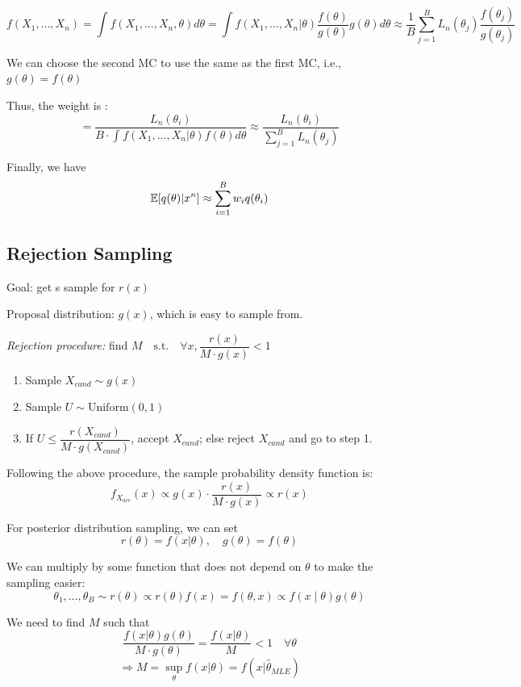 \[
f(X_1,\dots,X_n) = \int f(X_1,\dots,X_n,\theta) d \theta = \int f(X_1,\dots,X_n | \theta) \dfrac{f(\theta)}{g(\theta)} g(\theta) d \theta \approx \dfrac{1}{B} \sum_{j=1}^{B} L_n(\theta_j) \dfrac{f(\theta_j)}{g(\theta_j)}
\]

We can choose the second MC to use the same as the first MC, i.e., $g(\theta) = f(\theta)$

Thus, the weight is :
\[
=  \dfrac{L_n(\theta_i)}{B \cdot \int_{}^{} f(X_1,\dots,X_n | \theta) f(\theta) d\theta} \approx \frac{L_n(\theta_i)}{ \sum\limits_{j=1}^{B} L_n(\theta_j) } 
\]

Finally, we have
\[
\mathbb{E}[q(\theta) | x^n] \approx \sum_{i=1}^B w_i q(\theta_i)
\]

\subsection{Rejection Sampling} %
\label{sub:Rejection Sampling}

Goal: get s sample for $r(x)$

Proposal distribution: $g(x)$, which is easy to sample from.

\emph{Rejection procedure:} find  $M \quad \text{s.t.} \quad \forall x, \dfrac{r(x)}{M\cdot g(x)} < 1 $

\begin{enumerate}
    \item Sample $X_{cand}  \sim g(x)$
    \item Sample $U \sim \text{Uniform}(0,1)$
    \item If $U \le \dfrac{r(X_{cand} )}{M \cdot g(X_{cand} )}$, accept $X_{cand} $; else reject $X_{cand} $ and go to step 1.
\end{enumerate}

Following the above procedure, the sample probability density function is:
\[f_{X_{acc}} (x) \propto g(x) \cdot \dfrac{r(x)}{M \cdot g(x)} \propto r(x)\]


\begin{eb}
For posterior distribution sampling, we can set
\[
r(\theta) = f(x|\theta), \quad g(\theta) = f(\theta)
\]

We can multiply by some function that does not depend on $\theta$ to make the sampling easier:
\[
\theta_1, \dots, \theta_B \sim r(\theta) \propto r(\theta) f(x) = f(\theta,x) \propto f(x \mid \theta) g(\theta)
\]

We need to find $M$ such that
\[\dfrac{f(x|\theta) g(\theta)}{M \cdot g(\theta)} = \dfrac{f(x|\theta)}{M} < 1 \quad \forall \theta\]
\[\Rightarrow M = \sup_\theta f(x|\theta) = f(x|\hat \theta_{MLE} )\]
\end{eb}

